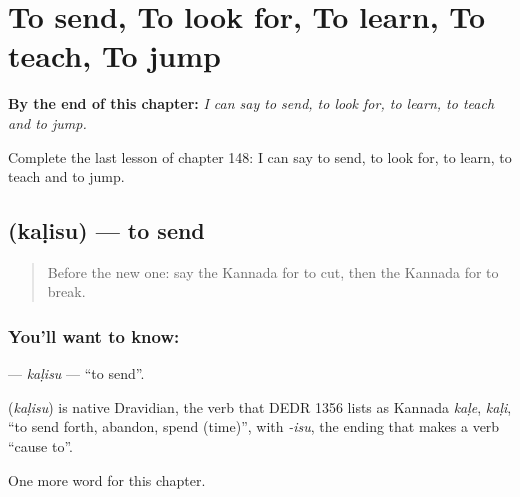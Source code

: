 
\chapter{To send, To look for, To learn, To teach, To jump}
\label{ch:ka-to-send-to-look-for-to-learn-to-teach-to-jump}

\begin{chapteropening}
\textbf{By the end of this chapter:} \emph{I can say to send, to look for, to learn, to teach and to jump.}

Complete the last lesson of chapter 148: I can say to send, to look for, to learn, to teach and to jump.
\end{chapteropening}

\section[\texorpdfstring{\kn{ಕಳಿಸು} (kaḷisu)}{ಕಳಿಸು (kaḷisu)}]{ (kaḷisu) — to send}

\label{lesson:KA-C148-kalisu}



\begin{quote}
Before the new one: say the Kannada for to cut, then the Kannada for to break.
\end{quote}

\subsection*{You'll want to know: }
\textbf{} — \emph{kaḷisu} — \textquotedblleft{}to send\textquotedblright{}.

\begin{cousinweb}
\textbf{} (\emph{kaḷisu}) is native Dravidian, the verb that DEDR 1356 lists as Kannada \emph{kaḷe}, \emph{kaḷi}, \textquotedblleft{}to send forth, abandon, spend (time)\textquotedblright{}, with \emph{-isu}, the ending that makes a verb \textquotedblleft{}cause to\textquotedblright{}.
\end{cousinweb}

\begin{grammarlens}[title={What you've built}]
One more word for this chapter.
\end{grammarlens}

